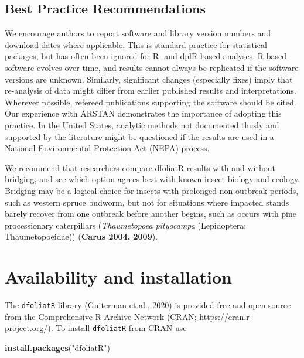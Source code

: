 \documentclass[review]{elsarticle} %
\newenvironment{Shaded}{\begin{snugshade}}{\end{snugshade}}
\newcommand{\KeywordTok}[1]{\textcolor[rgb]{0.13,0.29,0.53}{\textbf{#1}}}
\newcommand{\NormalTok}[1]{#1}
\newcommand{\StringTok}[1]{\textcolor[rgb]{0.31,0.60,0.02}{#1}}
\begin{document}
\hypertarget{best-practice-recommendations}{%
\subsection{Best Practice Recommendations}\label{best-practice-recommendations}}

We encourage authors to report software and library version numbers and download dates where applicable. This is standard practice for statistical packages, but has often been ignored for R- and dplR-based analyses. R-based software evolves over time, and results cannot always be replicated if the software versions are unknown. Similarly, significant changes (especially fixes) imply that re-analysis of data might differ from earlier published results and interpretations. Wherever possible, refereed publications supporting the software should be cited. Our experience with ARSTAN demonstrates the importance of adopting this practice. In the United States, analytic methods not documented thusly and supported by the literature might be questioned if the results are used in a National Environmental Protection Act (NEPA) process.

We recommend that researchers compare dfoliatR results with and without bridging, and see which option agrees best with known insect biology and ecology. Bridging may be a logical choice for insects with prolonged non-outbreak periods, such as western spruce budworm, but not for situations where impacted stands barely recover from one outbreak before another begins, such as occurs with pine processionary caterpillars (\emph{Thaumetopoea pityocampa} (Lepidoptera: Thaumetopoeidae)) (\textbf{Carus 2004, 2009}).

\hypertarget{availability-and-installation}{%
\section{Availability and installation}\label{availability-and-installation}}

The \texttt{dfoliatR} library (Guiterman et al., 2020) is provided free and open source from the Comprehensive R Archive Network (CRAN; \url{https://cran.r-project.org/}). To install \texttt{dfoliatR} from CRAN use

\begin{Shaded}
\begin{Highlighting}[]
\KeywordTok{install.packages}\NormalTok{(}\StringTok{"dfoliatR"}\NormalTok{)}
\end{Highlighting}
\end{Shaded}
\end{document}
